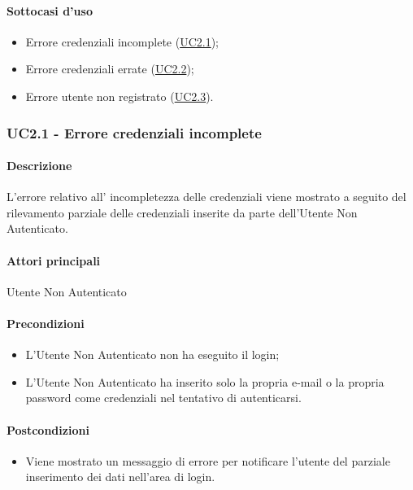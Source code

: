 \paragraph*{Sottocasi d'uso}
\begin{itemize}
  \item Errore credenziali incomplete (\hyperref[UC2point1]{UC2.1});
  \item Errore credenziali errate (\hyperref[UC2point2]{UC2.2});
  \item Errore utente non registrato (\hyperref[UC2point3]{UC2.3}).
\end{itemize}


\subsubsection{UC2.1 - Errore credenziali incomplete}\label{UC2point1}
\paragraph*{Descrizione}
L’errore relativo all’ incompletezza delle credenziali viene mostrato a seguito del rilevamento parziale delle credenziali inserite da parte dell’Utente Non Autenticato.

\paragraph*{Attori principali} Utente Non Autenticato

\paragraph*{Precondizioni}
\begin{itemize}
  \item L’Utente Non Autenticato non ha eseguito il login;
  \item L’Utente Non Autenticato ha inserito solo la propria e-mail o la propria password come credenziali nel tentativo di autenticarsi.  
\end{itemize}

\paragraph*{Postcondizioni}
\begin{itemize}
  \item Viene mostrato un messaggio di errore per notificare l’utente del parziale inserimento dei dati nell’area di login.
\end{itemize}

